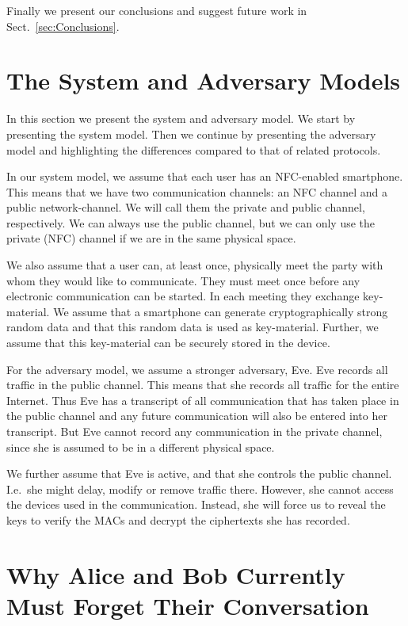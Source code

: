 Finally we present our conclusions and suggest future work in 
Sect.~\ref{sec:Conclusions}.


\section{The System and Adversary Models}

In this section we present the system and adversary model.
We start by presenting the system model.
Then we continue by presenting the adversary model and highlighting the 
differences compared to that of related protocols.

In our system model, we assume that each user has an \ac{NFC}-enabled 
smartphone.
This means that we have two communication channels: an \ac{NFC} channel and 
a public network-channel.
We will call them the private and public channel, respectively.
We can always use the public channel, but we can only use the private 
(\ac{NFC}) channel if we are in the same physical space.

We also assume that a user can, at least once, physically meet the party with 
whom they would like to communicate.
They must meet once before any electronic communication can be started.
In each meeting they exchange key-material.
We assume that a smartphone can generate cryptographically strong random data 
and that this random data is used as key-material.
Further, we assume that this key-material can be securely stored in the device.

For the adversary model, we assume a stronger adversary, Eve.
Eve records all traffic in the public channel.
This means that she records all traffic for the entire Internet.
Thus Eve has a transcript of all communication that has taken place in the 
public channel and any future communication will also be entered into her 
transcript.
But Eve cannot record any communication in the private channel, since she is 
assumed to be in a different physical space.

We further assume that Eve is active, and that she controls the public 
channel.
I.e.~she might delay, modify or remove traffic there.
However, she cannot access the devices used in the communication.
Instead, she will force us to reveal the keys to verify the \acp{MAC} and 
decrypt the ciphertexts she has recorded.



\section{Why Alice and Bob Currently Must Forget Their Conversation}
\label{sec:undeniability}

